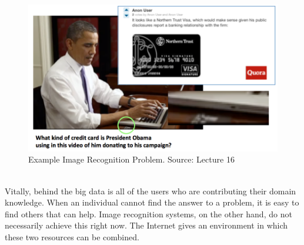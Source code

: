\documentclass[11pt]{article}
\begin{document}
\begin{figure}[h]
  \centering
  \includegraphics[scale=0.6]{obamacreditcard.png}
  \caption{Example Image Recognition Problem. Source: Lecture 16}
\end{figure}\\
Vitally, behind the big data is all of the users who are contributing their domain knowledge. When an individual cannot find the answer to a problem, it is easy to find others that can help. Image recognition systems, on the other hand, do not necessarily achieve this right now. The Internet gives an environment in which these two resources can be combined.
\end{document}

